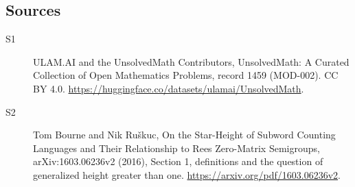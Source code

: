 \documentclass[11pt]{article}
\begin{document}
\subsection{Sources}
\begin{description}
\item[\hypertarget{source:1459:1}{S1}] ULAM.AI and the UnsolvedMath Contributors, UnsolvedMath: A Curated Collection of Open Mathematics Problems, record 1459 (MOD-002). CC BY 4.0. \url{https://huggingface.co/datasets/ulamai/UnsolvedMath}.
\item[\hypertarget{source:1459:2}{S2}] Tom Bourne and Nik Ruškuc, On the Star-Height of Subword Counting Languages and Their Relationship to Rees Zero-Matrix Semigroups, arXiv:1603.06236v2 (2016), Section 1, definitions and the question of generalized height greater than one. \url{https://arxiv.org/pdf/1603.06236v2}.
\end{description}
\label{end:1459}
\end{document}
